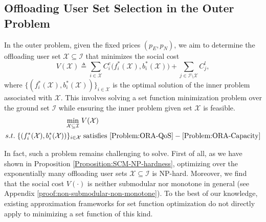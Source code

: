 \documentclass[lettersize,journal]{IEEEtran}
\begin{document}
\subsection{Offloading User Set Selection in the Outer Problem}\label{sec:outer-problem}
In the outer problem, given the fixed prices $(p_E,p_N)$, we aim to determine the offloading user set $\mathcal{X} \subseteq \mathcal{I}$ that minimizes the social cost
\begin{equation}\label{eq:social-cost-V(X)}
V(\mathcal{X}) \triangleq \sum_{i\in \mathcal{X}} C_i^e\big(f_i^*(\mathcal{X}),b_i^*(\mathcal{X})\big)
          + \sum_{j\in \mathcal{I}\setminus \mathcal{X}} C_j^l,
\end{equation}
where $\{(f_i^*(\mathcal{X}),b_i^*(\mathcal{X}))\}_{i\in \mathcal{X}}$ is the optimal solution of the inner problem associated with $\mathcal{X}$. This involves solving a set function minimization problem over the ground set $\mathcal{I}$ while ensuring the inner problem given set $\mathcal{X}$ is feasible.
\begin{align}\label{Problem:outer-problem}
    \min_{\mathcal{X}\subseteq\mathcal{I}}\;&V(\mathcal{X})\\
    s.t.\;\{(f_i^*(\mathcal{X}),b_i^*(\mathcal{X}))\}_{i\in \mathcal{X}}&\;\text{satisfies }\eqref{Problem:ORA-QoS}-\eqref{Problem:ORA-Capacity}\nonumber
\end{align}

In fact, such a problem remains challenging to solve. First of all, as we have shown in Proposition \ref{Proposition:SCM-NP-hardness}, optimizing over the exponentially many offloading user sets $\mathcal{X}\subseteq\mathcal{I}$ is NP-hard. Moreover, we find that the social cost $V(\mathcal{\cdot})$ is neither submodular nor monotone in general (see Appendix \ref{proof:non-submodular-non-monotone}). To the best of our knowledge, existing approximation frameworks \cite{schrijver2000combinatorial,buchbinder2018deterministic,shi2024approximation} for set function optimization do not directly apply to minimizing a set function of this kind.
\end{document}
